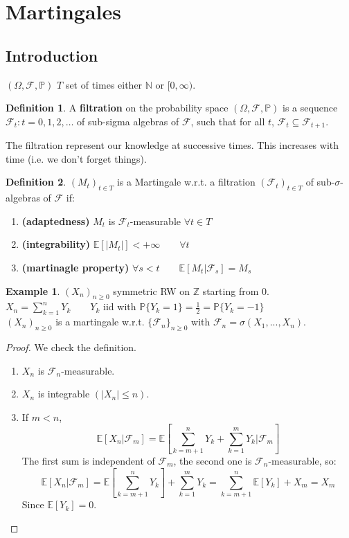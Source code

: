 \documentclass[10pt,a4paper]{article}
\theoremstyle{definition}
\newtheorem{defi}{Definition}[section]
\newtheorem{exi}{Example}[section]
\begin{document}
\section{Martingales}
\subsection{Introduction}
$ (\Omega,\mathcal{F},\mathbb{P}) $ $T$ set of times either $\mathbb{N}$ or $[0,\infty)$.
\begin{defi}
	A \textbf{filtration} on the probability space $ (\Omega,\mathcal{F},\mathbb{P})$ is a sequence ${\mathcal{F}_{t}:t=0,1,2, \ldots}$ of sub-sigma algebras of $\mathcal{F}$, such that for all $t$, $\mathcal{F}_{t} \subseteq \mathcal{F}_{t+1}$.
\end{defi}
The filtration represent our knowledge at successive times. This increases with time (i.e. we don't forget things).
\begin{defi}
	$(M_t)_{t\in T}$ is a Martingale w.r.t. a filtration $(\mathcal{F}_t)_{t\in T}$ of sub-$\sigma$-algebras of $\mathcal{F}$ if:
	\begin{enumerate}
		\item \textbf{(adaptedness)} $M_t$ is $\mathcal{F}_t$-measurable $\forall t\in T$
		\item \textbf{(integrability)} $\mathbb{E}[|M_t|]<+\infty \qquad\forall t$
		\item \textbf{(martinagle property)} $\forall s<t \qquad \mathbb{E}[M_t|\mathcal{F}_s]=M_s$
	\end{enumerate}
\end{defi}
\begin{exi}
	$(X_n)_{n\geq0}$ symmetric RW on $\mathbb{Z}$ starting from $0$.\\
	$X_n=\sum_{k=1}^{n}Y_k \qquad Y_k$ iid with $\mathbb{P}\{Y_k=1\}=\frac{1}{2}=\mathbb{P}\{Y_k=-1\}$ \\
	$(X_n)_{n\geq0}$ is a martingale w.r.t. $\{\mathcal{F}_n\}_{n\geq0}$ with $\mathcal{F}_n=\sigma(X_1,...,X_n)$.
\end{exi}
\begin{proof}
	We check the definition.
	\begin{enumerate}
		\item $X_n$ is $\mathcal{F}_n$-measurable.
		\item $X_n$ is integrable $(|X_n|\leq n)$.
		\item If $m<n$,
		\begin{equation*}
			\mathbb{E}[X_n|\mathcal{F}_m]=\mathbb{E}\left[ \sum_{k=m+1}^{n}Y_k+\sum_{k=1}^{m}Y_k|\mathcal{F}_m \right]  
		\end{equation*}
		The first sum is independent of $\mathcal{F}_m$, the second one is $\mathcal{F}_n$-measurable, so:
		\begin{equation*}
			\mathbb{E}[X_n|\mathcal{F}_m]=\mathbb{E}\left[ \sum_{k=m+1}^{n}Y_k \right]  +\sum_{k=1}^{m}Y_k=\sum_{k=m+1}^{n}\mathbb{E}[Y_k]+X_m=X_m
		\end{equation*}
	Since $\mathbb{E}[Y_k]=0$.
	\end{enumerate}
\end{proof}
\end{document}
